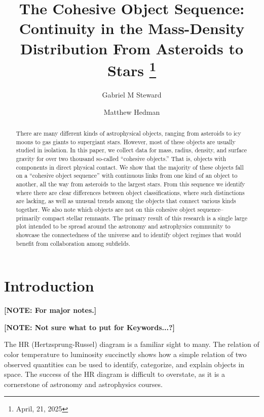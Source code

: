 \documentclass[twocolumn,linenumbers]{aastex631}
\begin{document}
\title{The Cohesive Object Sequence: Continuity in the Mass-Density Distribution From Asteroids to Stars
\footnote{April, 21, 2025}}

\author[0000-0002-8482-4669]{Gabriel M Steward}

\author[0000-0002-8592-0812]{Matthew Hedman}

\begin{abstract}

There are many different kinds of astrophysical objects, ranging from asteroids to icy moons to gas giants to supergiant stars. However, most of these objects are usually studied in isolation. In this paper, we collect data for mass, radius, density, and surface gravity for over two thousand so-called ``cohesive objects.'' That is, objects with components in direct physical contact. We show that the majority of these objects fall on a ``cohesive object sequence'' with continuous links from one kind of an object to another, all the way from asteroids to the largest stars. From this sequence we identify where there are clear differences between object classifications, where such distinctions are lacking, as well as unusual trends among the objects that connect various kinds together. We also note which objects are not on this cohesive object sequence--primarily compact stellar remnants. The primary result of this research is a single large plot intended to be spread around the astronomy and astrophysics community to showcase the connectedness of the universe and to identify object regimes that would benefit from collaboration among subfields.

\end{abstract}


\section{Introduction} \label{sec:intro}

\textbf{\color{red} [NOTE: For major notes.] \color{black}}

\textbf{\color{red} [NOTE: Not sure what to put for Keywords...?] \color{black}}

The HR (Hertzsprung-Russel) diagram is a familiar sight to many. The relation of color temperature to luminosity succinctly shows how a simple relation of two observed quantities can be used to identify, categorize, and explain objects in space. The success of the HR diagram is difficult to overstate, as it is a cornerstone of astronomy and astrophysics courses. 
\end{document}
